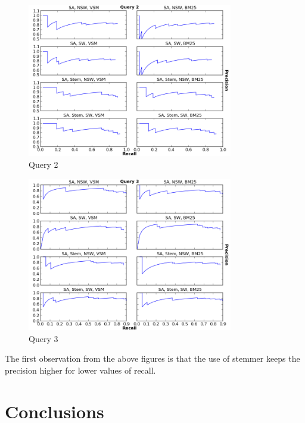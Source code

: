 \begin{figure}[ht]
  \centering
  \includegraphics[width=0.8\textwidth]{Query2.png}
  \caption{Query 2 }
  \label{fig:Query2}
\end{figure}
\FloatBarrier

\begin{figure}[ht]
  \centering
  \includegraphics[width=0.8\textwidth]{Query3.png}
  \caption{Query 3 }
  \label{fig:Query3}
\end{figure}
\FloatBarrier


The first observation from the above figures is that the use of stemmer keeps the precision higher for lower values of recall. 



\section{Conclusions}



